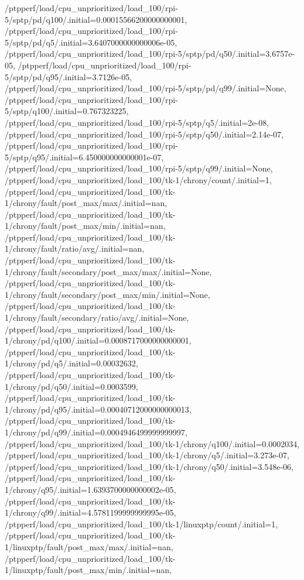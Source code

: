 {    /ptpperf/load/cpu_unprioritized/load_100/rpi-5/sptp/pd/q100/.initial=0.00015566200000000001,
    /ptpperf/load/cpu_unprioritized/load_100/rpi-5/sptp/pd/q5/.initial=3.6407000000000006e-05,
    /ptpperf/load/cpu_unprioritized/load_100/rpi-5/sptp/pd/q50/.initial=3.6757e-05,
    /ptpperf/load/cpu_unprioritized/load_100/rpi-5/sptp/pd/q95/.initial=3.7126e-05,
    /ptpperf/load/cpu_unprioritized/load_100/rpi-5/sptp/pd/q99/.initial=None,
    /ptpperf/load/cpu_unprioritized/load_100/rpi-5/sptp/q100/.initial=0.767323225,
    /ptpperf/load/cpu_unprioritized/load_100/rpi-5/sptp/q5/.initial=2e-08,
    /ptpperf/load/cpu_unprioritized/load_100/rpi-5/sptp/q50/.initial=2.14e-07,
    /ptpperf/load/cpu_unprioritized/load_100/rpi-5/sptp/q95/.initial=6.450000000000001e-07,
    /ptpperf/load/cpu_unprioritized/load_100/rpi-5/sptp/q99/.initial=None,
    /ptpperf/load/cpu_unprioritized/load_100/tk-1/chrony/count/.initial=1,
    /ptpperf/load/cpu_unprioritized/load_100/tk-1/chrony/fault/post_max/max/.initial=nan,
    /ptpperf/load/cpu_unprioritized/load_100/tk-1/chrony/fault/post_max/min/.initial=nan,
    /ptpperf/load/cpu_unprioritized/load_100/tk-1/chrony/fault/ratio/avg/.initial=nan,
    /ptpperf/load/cpu_unprioritized/load_100/tk-1/chrony/fault/secondary/post_max/max/.initial=None,
    /ptpperf/load/cpu_unprioritized/load_100/tk-1/chrony/fault/secondary/post_max/min/.initial=None,
    /ptpperf/load/cpu_unprioritized/load_100/tk-1/chrony/fault/secondary/ratio/avg/.initial=None,
    /ptpperf/load/cpu_unprioritized/load_100/tk-1/chrony/pd/q100/.initial=0.0008717000000000001,
    /ptpperf/load/cpu_unprioritized/load_100/tk-1/chrony/pd/q5/.initial=0.00032632,
    /ptpperf/load/cpu_unprioritized/load_100/tk-1/chrony/pd/q50/.initial=0.0003599,
    /ptpperf/load/cpu_unprioritized/load_100/tk-1/chrony/pd/q95/.initial=0.00040712000000000013,
    /ptpperf/load/cpu_unprioritized/load_100/tk-1/chrony/pd/q99/.initial=0.0004946499999999997,
    /ptpperf/load/cpu_unprioritized/load_100/tk-1/chrony/q100/.initial=0.0002034,
    /ptpperf/load/cpu_unprioritized/load_100/tk-1/chrony/q5/.initial=3.273e-07,
    /ptpperf/load/cpu_unprioritized/load_100/tk-1/chrony/q50/.initial=3.548e-06,
    /ptpperf/load/cpu_unprioritized/load_100/tk-1/chrony/q95/.initial=1.6393700000000002e-05,
    /ptpperf/load/cpu_unprioritized/load_100/tk-1/chrony/q99/.initial=4.5781199999999995e-05,
    /ptpperf/load/cpu_unprioritized/load_100/tk-1/linuxptp/count/.initial=1,
    /ptpperf/load/cpu_unprioritized/load_100/tk-1/linuxptp/fault/post_max/max/.initial=nan,
    /ptpperf/load/cpu_unprioritized/load_100/tk-1/linuxptp/fault/post_max/min/.initial=nan,
}

